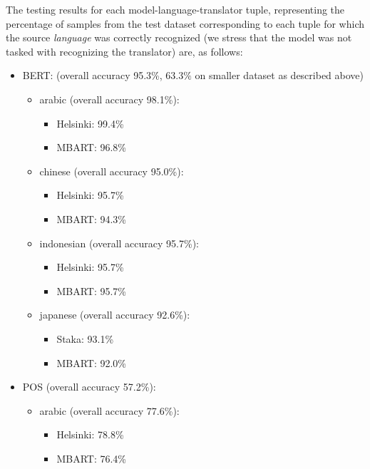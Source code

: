 \documentclass[twocolumn]{article}
\begin{document}
The testing results for each model-language-translator tuple, representing the percentage of samples from the test dataset corresponding to each tuple for which the source \emph{language} was correctly recognized (we stress that the model was not tasked with recognizing the translator) are, as follows:

\begin{itemize}
	\item BERT: (overall accuracy 95.3\%, $63.3\%$ on smaller dataset as described above)
		\begin{itemize}
		\item{arabic} (overall accuracy 98.1\%):
            \begin{itemize}
                \item Helsinki: 99.4\%
                \item MBART: 96.8\%
            \end{itemize}
		\item{chinese} (overall accuracy 95.0\%):
            \begin{itemize}
                \item Helsinki: 95.7\%
                \item MBART: 94.3\%
            \end{itemize}
		\item{indonesian} (overall accuracy 95.7\%):
            \begin{itemize}
                \item Helsinki: 95.7\%
                \item MBART: 95.7\%
            \end{itemize}
		\item{japanese} (overall accuracy 92.6\%):
            \begin{itemize}
                \item Staka: 93.1\%
                \item MBART: 92.0\%
            \end{itemize}
		\end{itemize}
	\item POS (overall accuracy 57.2\%):
		\begin{itemize}
		\item{arabic} (overall accuracy 77.6\%):
		\begin{itemize}
			\item Helsinki: 78.8\%
			\item MBART: 76.4\%
		\end{itemize}
  

\end{itemize}
\end{itemize}
\end{document}
